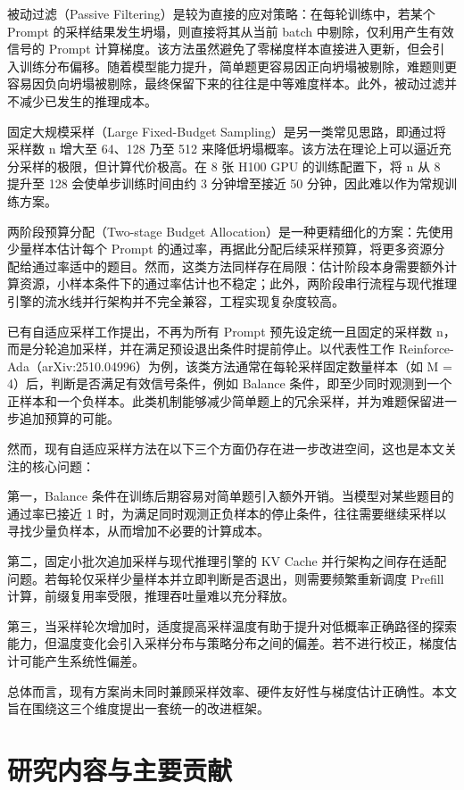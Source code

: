 被动过滤（Passive Filtering）是较为直接的应对策略：在每轮训练中，若某个 Prompt 的采样结果发生坍塌，则直接将其从当前 batch 中剔除，仅利用产生有效信号的 Prompt 计算梯度。该方法虽然避免了零梯度样本直接进入更新，但会引入训练分布偏移。随着模型能力提升，简单题更容易因正向坍塌被剔除，难题则更容易因负向坍塌被剔除，最终保留下来的往往是中等难度样本。此外，被动过滤并不减少已发生的推理成本。

固定大规模采样（Large Fixed-Budget Sampling）是另一类常见思路，即通过将采样数 n 增大至 64、128 乃至 512 来降低坍塌概率。该方法在理论上可以逼近充分采样的极限，但计算代价极高。在 8 张 H100 GPU 的训练配置下，将 n 从 8 提升至 128 会使单步训练时间由约 3 分钟增至接近 50 分钟，因此难以作为常规训练方案。

两阶段预算分配（Two-stage Budget Allocation）是一种更精细化的方案：先使用少量样本估计每个 Prompt 的通过率，再据此分配后续采样预算，将更多资源分配给通过率适中的题目。然而，这类方法同样存在局限：估计阶段本身需要额外计算资源，小样本条件下的通过率估计也不稳定；此外，两阶段串行流程与现代推理引擎的流水线并行架构并不完全兼容，工程实现复杂度较高。

已有自适应采样工作提出，不再为所有 Prompt 预先设定统一且固定的采样数 n，而是分轮追加采样，并在满足预设退出条件时提前停止。以代表性工作 Reinforce-Ada（arXiv:2510.04996）为例，该类方法通常在每轮采样固定数量样本（如 M = 4）后，判断是否满足有效信号条件，例如 Balance 条件，即至少同时观测到一个正样本和一个负样本。此类机制能够减少简单题上的冗余采样，并为难题保留进一步追加预算的可能。

然而，现有自适应采样方法在以下三个方面仍存在进一步改进空间，这也是本文关注的核心问题：

第一，Balance 条件在训练后期容易对简单题引入额外开销。当模型对某些题目的通过率已接近 1 时，为满足同时观测正负样本的停止条件，往往需要继续采样以寻找少量负样本，从而增加不必要的计算成本。

第二，固定小批次追加采样与现代推理引擎的 KV Cache 并行架构之间存在适配问题。若每轮仅采样少量样本并立即判断是否退出，则需要频繁重新调度 Prefill 计算，前缀复用率受限，推理吞吐量难以充分释放。

第三，当采样轮次增加时，适度提高采样温度有助于提升对低概率正确路径的探索能力，但温度变化会引入采样分布与策略分布之间的偏差。若不进行校正，梯度估计可能产生系统性偏差。

总体而言，现有方案尚未同时兼顾采样效率、硬件友好性与梯度估计正确性。本文旨在围绕这三个维度提出一套统一的改进框架。


\section{研究内容与主要贡献}

